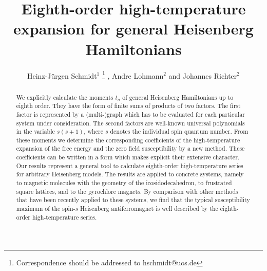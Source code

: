 \documentclass[aps,twocolumn,groupedaddress]{revtex4}
\begin{document}




\title[HTE of Heisenberg Hamiltonians ]
{Eighth-order high-temperature expansion for general Heisenberg
Hamiltonians}

\author{Heinz-J\"urgen Schmidt$^1$
\footnote[3]{Correspondence should be addressed to
hschmidt@uos.de}
, Andre Lohmann$^2$ and Johannes Richter$^2$ }

\address{$^1$Universit\"at Osnabr\"uck, Fachbereich Physik,
Barbarastr. 7, D - 49069 Osnabr\"uck, Germany\\
$^2$Institut f\"ur Theoretische Physik, Otto-von-Guericke-Universit\"at Magdeburg,\\
PF 4120, D - 39016 Magdeburg, Germany }





\begin{abstract}
We explicitly calculate the moments $t_n$ of general Heisenberg
Hamiltonians up to eighth order. They have the form of finite sums
of products of two factors. The first factor is represented by a
(multi-)graph which has to be evaluated for each particular system
under consideration. The second factors are well-known universal
polynomials in the variable $s(s+1)$, where $s$ denotes the
individual spin quantum number. From these moments we determine the
corresponding coefficients of the high-temperature expansion of the
free energy and the zero field susceptibility by a new method. These
coefficients can be written in a form which makes explicit their
extensive character. Our results represent a general tool to
calculate eighth-order high-temperature series for arbitrary
Heisenberg models. The results are applied to concrete systems,
namely to magnetic molecules with the geometry of the
icosidodecahedron, to frustrated square lattices, and to the
pyrochlore magnets. By comparison with other methods that have been
recently applied to these systems, we find that the typical
susceptibility maximum of the spin-$s$ Heisenberg antiferromagnet is
well described by the eighth-order high-temperature series.
\end{abstract}

\maketitle
\end{document}
